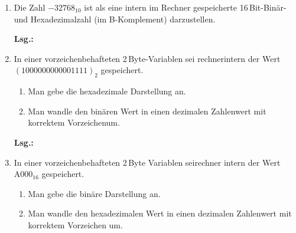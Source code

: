 \documentclass[12pt,a4paper]{scrreprt}
\newcommand{\Lsg}{\par \textbf{Lsg.: }}
\newcommand{\Byte}{\,Byte}
\newcommand{\Bit}{\,Bit}
\begin{document}
\begin{enumerate}
\begin{enumerate}
\item 125.875,

\Lsg%

\item -13.888,

\Lsg%

\item 0.3,

\Lsg%

\item 0.01953125,

\Lsg%

\item -2.25

\Lsg%

\end{enumerate}

\item Die Zahl $-32768_{10}$ ist als eine intern im Rechner gespeicherte \si{16}{\Bit}-Binär- und Hexadezimalzahl (im B-Komplement) darzustellen.

\Lsg%

\item In einer vorzeichenbehafteten \si{2}{\Byte}-Variablen sei rechnerintern der
Wert $(1000 0000 0000 1111)_2$ gespeichert.

\begin{enumerate}
\item Man gebe die hexadezimale Darstellung an.
\item Man wandle den binären Wert in einen dezimalen Zahlenwert mit korrektem Vorzeichenum.
\end{enumerate}

\Lsg%

\item In einer vorzeichenbehafteten \si{2}{\Byte} Variablen seirechner intern der Wert $\text{A000}_{16}$ gespeichert.
\begin{enumerate}
\item Man gebe die binäre Darstellung an.
\item Man wandle den hexadezimalen Wert in einen dezimalen Zahlenwert mit korrektem Vorzeichen um.
\end{enumerate}


\end{enumerate}
\end{document}

